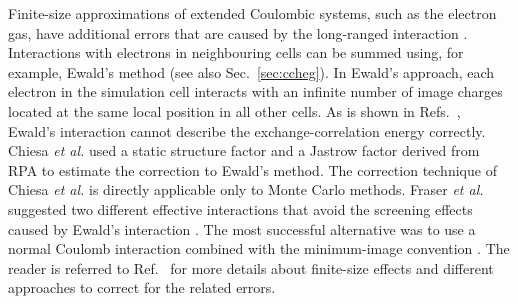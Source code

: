 \documentclass[a4paper,12pt]{report}
\begin{document}
Finite-size approximations of extended Coulombic systems, 
such as the electron gas, have additional errors that are 
caused by the long-ranged interaction \cite{fraser1996,
chiesa2006,drummond2008}. Interactions with electrons in
neighbouring cells can be summed using, for example,
Ewald's method \cite{ewald1921,fraser1996,wood2004,
drummond2008} (see also Sec.~\ref{sec:ccheg}). In 
Ewald's approach, each electron in the simulation cell
interacts with an infinite number of image charges located
at the same local position in all other cells. As is shown 
in Refs.~\cite{fraser1996,chiesa2006}, 
Ewald's interaction cannot describe the exchange-correlation
energy correctly. Chiesa \emph{et al.} \cite{chiesa2006}
used a static structure factor and a Jastrow factor
derived from RPA to estimate the correction to Ewald's
method. The correction technique of Chiesa \emph{et al.}
is directly applicable only to Monte Carlo methods.
Fraser \emph{et al.} \cite{fraser1996} suggested two 
different effective interactions that avoid the screening 
effects caused by Ewald's interaction . The most successful
alternative was to use a normal Coulomb interaction combined 
with the minimum-image convention \cite{fraser1996}.
The reader is referred to Ref.~\cite{drummond2008} for
more details about finite-size effects and different
approaches to correct for the related errors.


\end{document}
